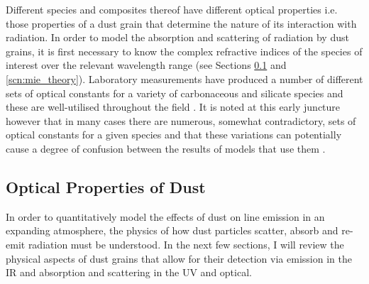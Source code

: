 Different species and composites thereof have different optical properties i.e. those properties of a dust grain that determine the nature of its interaction with radiation.  In order to model the absorption and scattering of radiation by dust grains, it is first necessary to know the complex refractive indices of the species of interest over the relevant wavelength range (see Sections \ref{opt_prop} and \ref{scn:mie_theory}).  Laboratory measurements have produced a number of different sets of optical constants for a variety of carbonaceous and silicate species and these are well-utilised throughout the field \citep{Draine1984,Zubko1996,Jager2003}.  It is noted at this early juncture however that in many cases there are numerous, somewhat contradictory, sets of optical constants for a given species and that these variations can potentially cause a degree of confusion between the results of models that use them \citep{Owen2015}.  
%



\subsection{Optical Properties of Dust}
\label{opt_prop}


In order to quantitatively model the effects of dust on line emission in an expanding atmosphere, the physics of how dust particles scatter, absorb and re-emit radiation must be understood. In the next few sections, I will review the physical aspects of dust grains that allow for their detection via emission in the IR and absorption and scattering in the UV and optical.   

